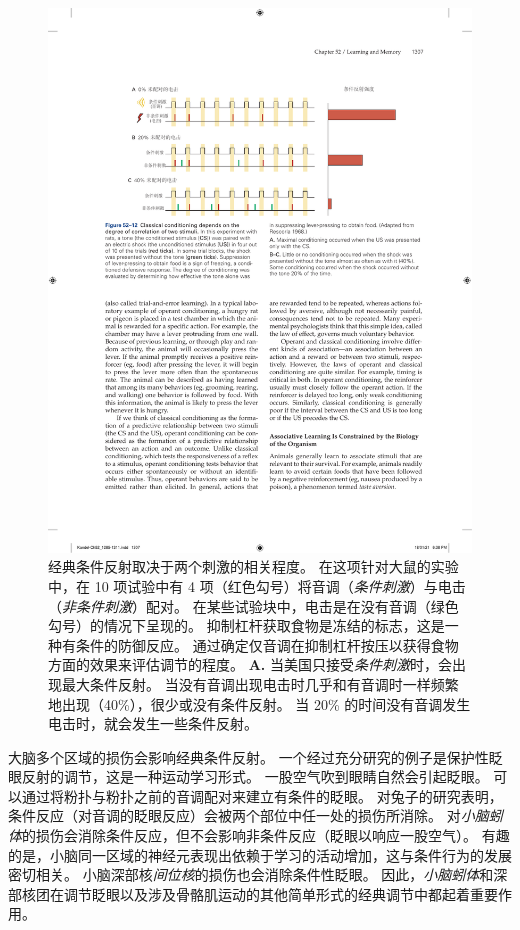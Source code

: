 \begin{figure}[htbp]
	\centering
	\includegraphics[width=0.95\linewidth]{chap52/fig_52_12}
	\caption{经典条件反射取决于两个刺激的相关程度。
		在这项针对大鼠的实验中，在 10 项试验中有 4 项（红色勾号）将音调（\textit{条件刺激}）与电击（\textit{非条件刺激}）配对。
		在某些试验块中，电击是在没有音调（绿色勾号）的情况下呈现的。
		抑制杠杆获取食物是冻结的标志，这是一种有条件的防御反应。
		通过确定仅音调在抑制杠杆按压以获得食物方面的效果来评估调节的程度\cite{rescorla1968probability}。
		\textbf{A.} 当美国只接受\textit{条件刺激}时，会出现最大条件反射。 
		当没有音调出现电击时几乎和有音调时一样频繁地出现（40\%），很少或没有条件反射。
		当 20\% 的时间没有音调发生电击时，就会发生一些条件反射。}
	\label{fig:52_12}
\end{figure}


大脑多个区域的损伤会影响经典条件反射。
一个经过充分研究的例子是保护性眨眼反射的调节，这是一种运动学习形式。
一股空气吹到眼睛自然会引起眨眼。
可以通过将粉扑与粉扑之前的音调配对来建立有条件的眨眼。
对兔子的研究表明，条件反应（对音调的眨眼反应）会被两个部位中任一处的损伤所消除。
对\textit{小脑蚓体}的损伤会消除条件反应，但不会影响非条件反应（眨眼以响应一股空气）。
有趣的是，小脑同一区域的神经元表现出依赖于学习的活动增加，这与条件行为的发展密切相关。
小脑深部核\textit{间位核}的损伤也会消除条件性眨眼。
因此，\textit{小脑蚓体}和深部核团在调节眨眼以及涉及骨骼肌运动的其他简单形式的经典调节中都起着重要作用。


